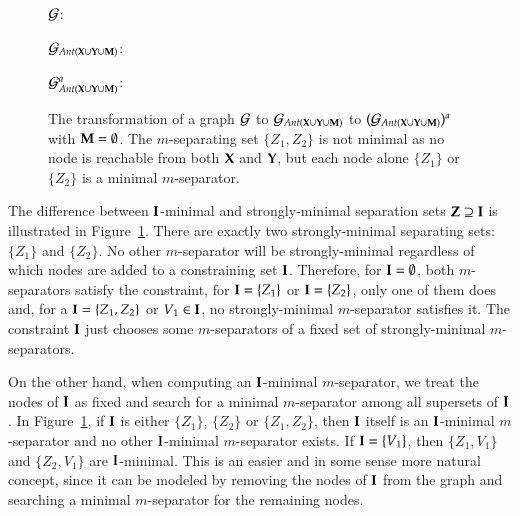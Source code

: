 \begin{figure}
\centering
${\cal G}$:
${\cal G}_{\textit{Ant}({\bf X} \cup {\bf Y} \cup {\bf M})}$:
${\cal G}^a_{\textit{Ant}({\bf X} \cup {\bf Y} \cup {\bf M})}$:
\caption{The transformation of a graph ${\cal G}$ to ${\cal G}_{\textit{Ant}({\bf X} \cup {\bf Y} \cup {\bf M})}$ to $({\cal G}_{\textit{Ant}({\bf X} \cup {\bf Y} \cup {\bf M})})^a$ with ${\bf M} = \emptyset$. The $m$-separating set $\{Z_1,Z_2\}$ is not minimal as no node is reachable from both ${\bf X}$ and ${\bf Y}$, but each node alone $\{Z_1\}$ or $\{Z_2\}$ is a minimal $m$-separator.}\label{fig:minseptest}
\end{figure}


The difference between $ {\bf I} $-minimal and strongly-minimal separation sets ${\bf Z}\supseteq {\bf I}$ 
is illustrated in Figure~\ref{fig:minseptest}. 
There are exactly two strongly-minimal separating sets: $ \{Z_1\} $ and $ \{Z_2\} $. 
No other  $m$-separator will be strongly-minimal regardless of which 
nodes are added to a constraining set $ {\bf I} $. 
Therefore, for $ {\bf I} = \emptyset $, both $m$-separators satisfy the constraint, 
for $ {\bf I}= \{Z_1\} $ or $ {\bf I}=\{Z_2\} $, only one of them does and, 
for a $ {\bf I} = \{Z_1, Z_2\}$ or $ V_1 \in {\bf I} $, no strongly-minimal 
$m$-separator satisfies it. 
The constraint $ {\bf I} $ just chooses some $m$-separators of 
a fixed set of strongly-minimal $m$-separators.

On the other hand, when computing an $ {\bf I} $-minimal $m$-separator, we treat the nodes of $ {\bf I} $ as fixed and search for a minimal $m$-separator among all supersets of $ {\bf I} $. In Figure~\ref{fig:minseptest}, if $ {\bf I}$ is either $ \{Z_1\}$, $\{Z_2\} $ or $\{Z_1,Z_2\} $, then $ {\bf I} $ itself is an $ {\bf I} $-minimal $m$-separator and no other $ {\bf I} $-minimal $m$-separator exists. If $ {\bf I} = \{V_1\} $, then $ \{Z_1, V_1\} $ and $ \{Z_2, V_1\} $ are $ {\bf I} $-minimal. This is an easier and in some sense more natural concept, since it can be modeled by removing the nodes of $ {\bf I}  $ from the graph and searching a minimal $m$-separator for the remaining nodes.


